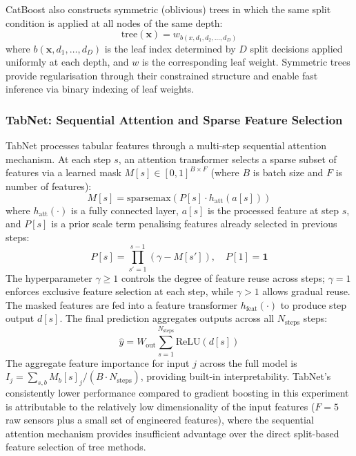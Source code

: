 CatBoost also constructs symmetric (oblivious) trees in which the same split condition is applied at all nodes of the same depth:
\begin{equation}
    \text{tree}(\mathbf{x}) = w_{b(x,d_1,d_2,\ldots,d_D)}
    \label{eq:symtree}
\end{equation}
where $b(\mathbf{x}, d_1, \ldots, d_D)$ is the leaf index determined by $D$ split decisions applied uniformly at each depth, and $w$ is the corresponding leaf weight. Symmetric trees provide regularisation through their constrained structure and enable fast inference via binary indexing of leaf weights.

\subsubsection{TabNet: Sequential Attention and Sparse Feature Selection}

TabNet processes tabular features through a multi-step sequential attention mechanism. At each step $s$, an attention transformer selects a sparse subset of features via a learned mask $M[s] \in [0,1]^{B \times F}$ (where $B$ is batch size and $F$ is number of features):
\begin{equation}
    M[s] = \text{sparsemax}\!\left(P[s] \cdot h_{\text{att}}(a[s])\right)
    \label{eq:tabnet_mask}
\end{equation}
where $h_{\text{att}}(\cdot)$ is a fully connected layer, $a[s]$ is the processed feature at step $s$, and $P[s]$ is a prior scale term penalising features already selected in previous steps:
\begin{equation}
    P[s] = \prod_{s'=1}^{s-1}\!\left(\gamma - M[s']\right), \quad P[1] = \mathbf{1}
    \label{eq:tabnet_prior}
\end{equation}
The hyperparameter $\gamma \geq 1$ controls the degree of feature reuse across steps; $\gamma = 1$ enforces exclusive feature selection at each step, while $\gamma > 1$ allows gradual reuse. The masked features are fed into a feature transformer $h_{\text{feat}}(\cdot)$ to produce step output $d[s]$. The final prediction aggregates outputs across all $N_{\text{steps}}$ steps:
\begin{equation}
    \hat{y} = W_{\text{out}} \sum_{s=1}^{N_{\text{steps}}} \text{ReLU}(d[s])
    \label{eq:tabnet_output}
\end{equation}
The aggregate feature importance for input $j$ across the full model is $I_j = \sum_{s,b} M_b[s]_j \big/ (B \cdot N_{\text{steps}})$, providing built-in interpretability. TabNet's consistently lower performance compared to gradient boosting in this experiment is attributable to the relatively low dimensionality of the input features ($F = 5$ raw sensors plus a small set of engineered features), where the sequential attention mechanism provides insufficient advantage over the direct split-based feature selection of tree methods.

